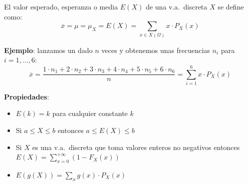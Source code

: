 \documentclass[10pt,a4paper]{article}
\begin{document}
\begin{tcolorbox}[title=Valor Esperado, equal height group=VA2]
    El valor esperado, esperanza o media $E(X)$ de una v.a.\ discreta $X$ se define como:
    \[
        \overline{x} = \mu = \mu_X = E(X) = \sum\limits_{x \in X(\Omega)}{x \cdot P_X(x)}
    \]

    \textbf{Ejemplo}: lanzamos un dado $n$ veces y obtenemos unas frecuencias $n_i$ para $i = 1,\ldots,6$:
    \[
        \overline{x} = \frac{1 \cdot n_1 + 2 \cdot n_2 + 3 \cdot n_3 + 4 \cdot n_4 + 5 \cdot n_5 + 6 \cdot n_6}{n} = \sum\limits_{i = 1}^{6}{x \cdot P_X(x)}
    \]

    \textbf{Propiedades}:
    \begin{itemize}
        \item $E(k) = k$ para cualquier constante $k$
        \item Si $a \leq X \leq b$ entonces $a \leq E(X) \leq b$
        \item Si $X$ es una v.a.\ discreta que toma valores enteros no negativos entonces $E(X) = \sum\limits_{x=0}^{+\infty}{(1 - F_X(x))}$
        \item $E(g(X)) = \sum\limits_{x}{g(x) \cdot P_X(x)}$
    \end{itemize}
\end{tcolorbox}
\end{document}
